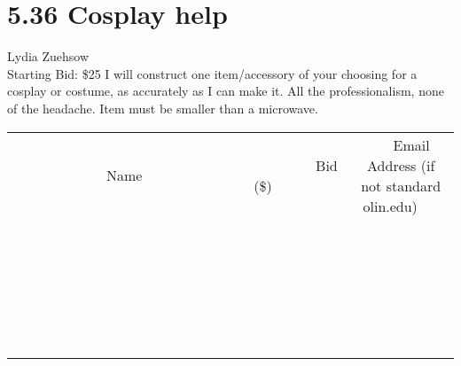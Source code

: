 \documentclass[11pt]{article}
\begin{document}
\section*{5.36 Cosplay help}
Lydia Zuehsow
\\
Starting Bid: \$25
\newline
I will construct one item/accessory of your choosing for a cosplay or costume, as accurately as I can make it. All the professionalism, none of the headache.
Item must be smaller than a microwave.
\\[6ex]
\begin{tabular}{c c c}
~~~~~~~~~~~~~Name~~~~~~~~~~~~~ & ~~~~~~~~~Bid (\$)~~~~~~~~~  & ~~~Email Address (if not standard olin.edu)~~~\\
 & & \\
\hline
 & & \\
\hline
 & & \\
\hline
 & & \\
\hline
 & & \\
\hline
 & & \\
\hline
 & & \\
\hline
 & & \\
\hline
 & & \\
\hline
 & & \\
\hline
 & & \\
\hline
 & & \\
\hline
 & & \\
\hline
 & & \\
\hline
 & & \\
\hline
 & & \\
\hline
 & & \\
\hline
 & & \\
\hline
 & & \\
\hline
 & & \\
\hline
 & & \\
\hline
 & & \\
\hline
 & & \\
\hline
 & & \\
\hline
 & & \\
\hline
 & & \\
\hline
\end{tabular}
\newpage
\end{document}
